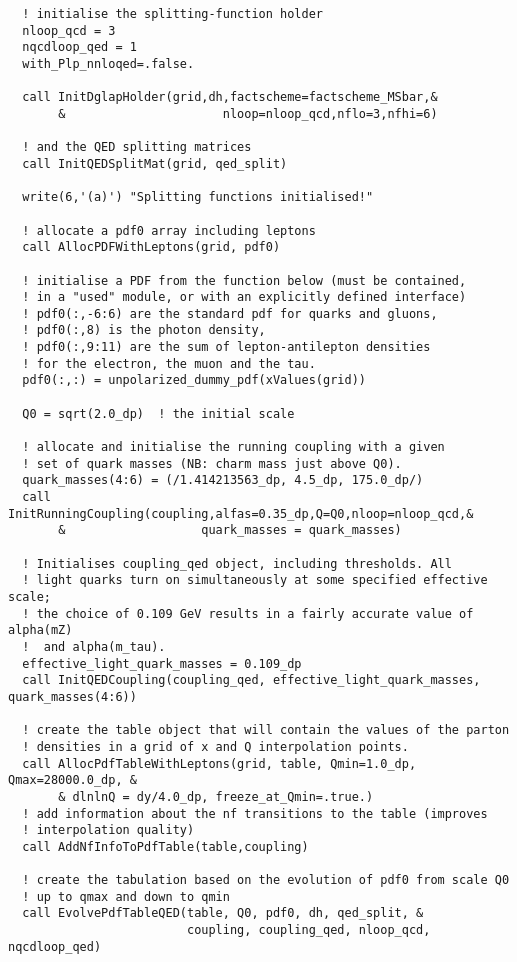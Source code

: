 \documentclass[12pt]{article}
\begin{document}
\begin{lstlisting}
  ! initialise the splitting-function holder
  nloop_qcd = 3
  nqcdloop_qed = 1
  with_Plp_nnloqed=.false.
  
  call InitDglapHolder(grid,dh,factscheme=factscheme_MSbar,&
       &                      nloop=nloop_qcd,nflo=3,nfhi=6)

  ! and the QED splitting matrices
  call InitQEDSplitMat(grid, qed_split)

  write(6,'(a)') "Splitting functions initialised!"

  ! allocate a pdf0 array including leptons
  call AllocPDFWithLeptons(grid, pdf0)

  ! initialise a PDF from the function below (must be contained,
  ! in a "used" module, or with an explicitly defined interface)
  ! pdf0(:,-6:6) are the standard pdf for quarks and gluons,
  ! pdf0(:,8) is the photon density,
  ! pdf0(:,9:11) are the sum of lepton-antilepton densities
  ! for the electron, the muon and the tau.
  pdf0(:,:) = unpolarized_dummy_pdf(xValues(grid))  

  Q0 = sqrt(2.0_dp)  ! the initial scale

  ! allocate and initialise the running coupling with a given
  ! set of quark masses (NB: charm mass just above Q0).
  quark_masses(4:6) = (/1.414213563_dp, 4.5_dp, 175.0_dp/)
  call InitRunningCoupling(coupling,alfas=0.35_dp,Q=Q0,nloop=nloop_qcd,&
       &                   quark_masses = quark_masses)

  ! Initialises coupling_qed object, including thresholds. All
  ! light quarks turn on simultaneously at some specified effective scale;
  ! the choice of 0.109 GeV results in a fairly accurate value of alpha(mZ)
  !  and alpha(m_tau).
  effective_light_quark_masses = 0.109_dp
  call InitQEDCoupling(coupling_qed, effective_light_quark_masses, quark_masses(4:6))

  ! create the table object that will contain the values of the parton
  ! densities in a grid of x and Q interpolation points.
  call AllocPdfTableWithLeptons(grid, table, Qmin=1.0_dp, Qmax=28000.0_dp, & 
       & dlnlnQ = dy/4.0_dp, freeze_at_Qmin=.true.)
  ! add information about the nf transitions to the table (improves
  ! interpolation quality)
  call AddNfInfoToPdfTable(table,coupling)

  ! create the tabulation based on the evolution of pdf0 from scale Q0
  ! up to qmax and down to qmin
  call EvolvePdfTableQED(table, Q0, pdf0, dh, qed_split, &
                         coupling, coupling_qed, nloop_qcd, nqcdloop_qed)


\end{lstlisting}
\end{document}
